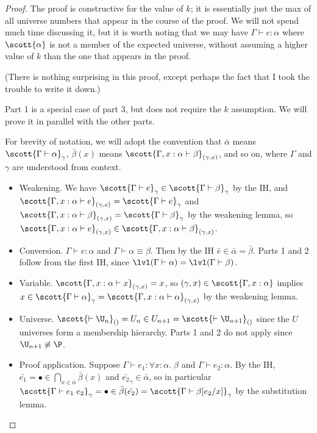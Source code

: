 \begin{proof}
The proof is constructive for the value of $k$; it is essentially just the max of all universe numbers that appear in the course of the proof. We will not spend much time discussing it, but it is worth noting that we may have $\Gamma\vdash e:\alpha$ where $\scott{\alpha}$ is not a member of the expected universe, without assuming a higher value of $k$ than the one that appears in the proof.

(There is nothing surprising in this proof, except perhaps the fact that I took the trouble to write it down.)

Part 1 is a special case of part 3, but does not require the $k$ assumption. We will prove it in parallel with the other parts.

For brevity of notation, we will adopt the convention that $\bar\alpha$ means $\scott{\Gamma\vdash\alpha}_\gamma$, $\bar\beta(x)$ means $\scott{\Gamma,x:\alpha\vdash\beta}_{(\gamma,x)}$, and so on, where $\Gamma$ and $\gamma$ are understood from context.
\begin{itemize}
\item Weakening. We have $\scott{\Gamma\vdash e}_\gamma\in\scott{\Gamma\vdash\beta}_\gamma$ by the IH, and $\scott{\Gamma,x:\alpha\vdash e}_{(\gamma,x)}=\scott{\Gamma\vdash e}_\gamma$ and $\scott{\Gamma,x:\alpha\vdash\beta}_{(\gamma,x)}=\scott{\Gamma\vdash\beta}_\gamma$ by the weakening lemma, so $\scott{\Gamma,x:\alpha\vdash e}_{(\gamma,x)}\in \scott{\Gamma,x:\alpha\vdash\beta}_{(\gamma,x)}$.
\item Conversion. $\Gamma\vdash e:\alpha$ and $\Gamma\vdash\alpha\equiv\beta$. Then by the IH $\bar e\in\bar \alpha=\bar\beta$. Parts 1 and 2 follow from the first IH, since $\lvl(\Gamma\vdash\alpha)=\lvl(\Gamma\vdash\beta)$.
\item Variable. $\scott{\Gamma,x:\alpha\vdash x}_{(\gamma,x)}=x$, so $(\gamma,x)\in\scott{\Gamma,x:\alpha}$ implies $x\in\scott{\Gamma\vdash\alpha}_\gamma=\scott{\Gamma,x:\alpha\vdash\alpha}_{(\gamma,x)}$ by the weakening lemma.
\item Universe. $\scott{\vdash\U_n}_{()}=U_n\in U_{n+1}=\scott{\vdash\U_{n+1}}_{()}$ since the $U$ universes form a membership hierarchy. Parts 1 and 2 do not apply since $\U_{n+1}\not\equiv\P$.
\item Proof application. Suppose $\Gamma\vdash e_1:\forall x:\alpha.\;\beta$ and $\Gamma\vdash e_2:\alpha$. By the IH, $\bar{e_1}=\bullet\in\bigcap_{x\in \bar\alpha}\bar\beta(x)$ and $\bar{e_2}_\gamma\in\bar\alpha$, so in particular $\scott{\Gamma\vdash e_1\;e_2}_\gamma=\bullet\in\bar\beta(\bar{e_2})=\scott{\Gamma\vdash\beta[e_2/x]}_\gamma$ by the substitution lemma.

\end{itemize}
\end{proof}
